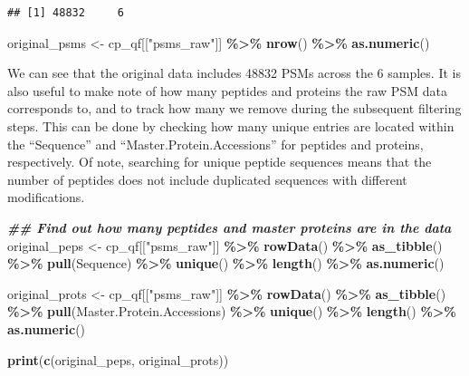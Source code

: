 \documentclass[9pt,a4paper,]{extarticle}
\newenvironment{Shaded}{\begin{snugshade}}{\end{snugshade}}
\newcommand{\DocumentationTok}[1]{\textcolor[rgb]{0.56,0.35,0.01}{\textbf{\textit{#1}}}}
\newcommand{\FunctionTok}[1]{\textcolor[rgb]{0.13,0.29,0.53}{\textbf{#1}}}
\newcommand{\NormalTok}[1]{#1}
\newcommand{\OtherTok}[1]{\textcolor[rgb]{0.56,0.35,0.01}{#1}}
\newcommand{\SpecialCharTok}[1]{\textcolor[rgb]{0.81,0.36,0.00}{\textbf{#1}}}
\newcommand{\StringTok}[1]{\textcolor[rgb]{0.31,0.60,0.02}{#1}}
\begin{document}
\begin{verbatim}
## [1] 48832     6
\end{verbatim}

\begin{Shaded}
\begin{Highlighting}[]
\NormalTok{original\_psms }\OtherTok{\textless{}{-}}\NormalTok{ cp\_qf[[}\StringTok{"psms\_raw"}\NormalTok{]] }\SpecialCharTok{\%\textgreater{}\%}
  \FunctionTok{nrow}\NormalTok{() }\SpecialCharTok{\%\textgreater{}\%}
  \FunctionTok{as.numeric}\NormalTok{()}
\end{Highlighting}
\end{Shaded}

We can see that the original data includes 48832 PSMs
across the 6 samples. It is also useful to make note of how many peptides and
proteins the raw PSM data corresponds to, and to track how many we remove during
the subsequent filtering steps. This can be done by checking how many unique entries
are located within the ``Sequence'' and ``Master.Protein.Accessions'' for peptides
and proteins, respectively. Of note, searching for unique peptide sequences means
that the number of peptides does not include duplicated sequences with different
modifications.

\begin{Shaded}
\begin{Highlighting}[]
\DocumentationTok{\#\# Find out how many peptides and master proteins are in the data}
\NormalTok{original\_peps }\OtherTok{\textless{}{-}}\NormalTok{ cp\_qf[[}\StringTok{"psms\_raw"}\NormalTok{]] }\SpecialCharTok{\%\textgreater{}\%} 
  \FunctionTok{rowData}\NormalTok{() }\SpecialCharTok{\%\textgreater{}\%} 
  \FunctionTok{as\_tibble}\NormalTok{() }\SpecialCharTok{\%\textgreater{}\%} 
  \FunctionTok{pull}\NormalTok{(Sequence) }\SpecialCharTok{\%\textgreater{}\%} 
  \FunctionTok{unique}\NormalTok{() }\SpecialCharTok{\%\textgreater{}\%}
  \FunctionTok{length}\NormalTok{() }\SpecialCharTok{\%\textgreater{}\%}
  \FunctionTok{as.numeric}\NormalTok{()}

\NormalTok{original\_prots }\OtherTok{\textless{}{-}}\NormalTok{ cp\_qf[[}\StringTok{"psms\_raw"}\NormalTok{]] }\SpecialCharTok{\%\textgreater{}\%} 
  \FunctionTok{rowData}\NormalTok{() }\SpecialCharTok{\%\textgreater{}\%} 
  \FunctionTok{as\_tibble}\NormalTok{() }\SpecialCharTok{\%\textgreater{}\%} 
  \FunctionTok{pull}\NormalTok{(Master.Protein.Accessions) }\SpecialCharTok{\%\textgreater{}\%} 
  \FunctionTok{unique}\NormalTok{() }\SpecialCharTok{\%\textgreater{}\%}
  \FunctionTok{length}\NormalTok{() }\SpecialCharTok{\%\textgreater{}\%}
  \FunctionTok{as.numeric}\NormalTok{()}

\FunctionTok{print}\NormalTok{(}\FunctionTok{c}\NormalTok{(original\_peps, original\_prots))}
\end{Highlighting}
\end{Shaded}
\end{document}
